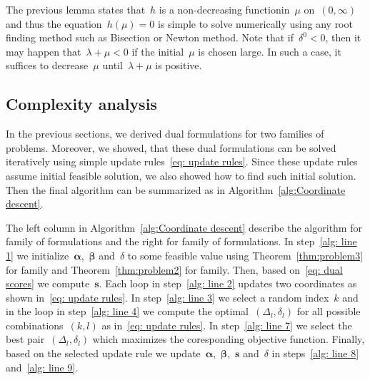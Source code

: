 The previous lemma states that~$h$ is a non-decreasing functionin~$\mu$ on~$(0,\infty)$ and thus the equation~$h(\mu) = 0$ is simple to solve numerically using any root finding method such as Bisection or Newton method.  Note that if~$\delta^0 < 0$, then it may happen that~$\lambda + \mu < 0$ if the initial~$\mu$ is chosen large. In such a case, it suffices to decrease~$\mu$ until~$\lambda + \mu$ is positive.


\subsection{Complexity analysis}

In the previous sections, we derived dual formulations for two families of problems. Moreover, we showed, that these dual formulations can be solved iteratively using simple update rules~\eqref{eq: update rules}. Since these update rules assume initial feasible solution, we also showed how to find such initial solution. Then the final algorithm can be summarized as in Algorithm~\ref{alg:Coordinate descent}.

The left column in Algorithm~\ref{alg:Coordinate descent} describe the algorithm for \TopPushK family of formulations and the right for \PatMat family of formulations. In step~\ref{alg: line 1} we initialize~$\bm{\alpha}$,~$\bm{\beta}$ and~$\delta$ to some feasible value using Theorem~\ref{thm:problem3} for \TopPushK family and  Theorem~\ref{thm:problem2} for \PatMat family. Then, based on~\eqref{eq: dual scores} we compute~$\bm{s}$. Each \repeatloop loop in step~\ref{alg: line 2} updates two coordinates as shown in~\eqref{eq: update rules}. In step~\ref{alg: line 3} we select a random index~$k$ and in the \forloop loop in step~\ref{alg: line 4} we compute the optimal~$(\Delta_l,\delta_l)$ for all possible combinations~$(k,l)$ as in~\eqref{eq: update rules}. In step~\ref{alg: line 7} we select the best pair~$(\Delta_l,\delta_l)$ which maximizes the coresponding objective function. Finally, based on the selected update rule we update~$\bm{\alpha}$,~$\bm{\beta}$,~$\bm{s}$ and~$\delta$ in steps~\ref{alg: line 8} and~\ref{alg: line 9}.

